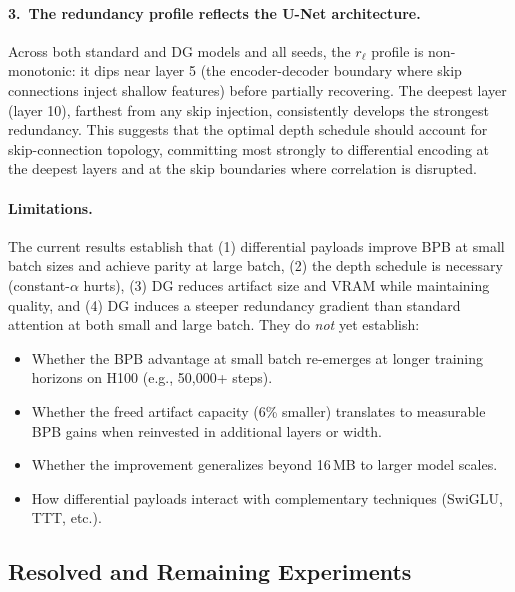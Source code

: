 \documentclass[11pt]{article}
\begin{document}
\paragraph{3.\ The redundancy profile reflects the U-Net architecture.}
Across both standard and DG models and all seeds, the $r_\ell$ profile is non-monotonic: it dips near layer 5 (the encoder-decoder boundary where skip connections inject shallow features) before partially recovering. The deepest layer (layer 10), farthest from any skip injection, consistently develops the strongest redundancy. This suggests that the optimal depth schedule should account for skip-connection topology, committing most strongly to differential encoding at the deepest layers and at the skip boundaries where correlation is disrupted.

\paragraph{Limitations.}
The current results establish that (1) differential payloads improve BPB at small batch sizes and achieve parity at large batch, (2) the depth schedule is necessary (constant-$\alpha$ hurts), (3) DG reduces artifact size and VRAM while maintaining quality, and (4) DG induces a steeper redundancy gradient than standard attention at both small and large batch. They do \emph{not} yet establish:
\begin{itemize}
    \item Whether the BPB advantage at small batch re-emerges at longer training horizons on H100 (e.g., 50{,}000+ steps).
    \item Whether the freed artifact capacity (6\% smaller) translates to measurable BPB gains when reinvested in additional layers or width.
    \item Whether the improvement generalizes beyond 16\,MB to larger model scales.
    \item How differential payloads interact with complementary techniques (SwiGLU, TTT, etc.).
\end{itemize}

\subsection{Resolved and Remaining Experiments}
\label{sec:future}
\end{document}
